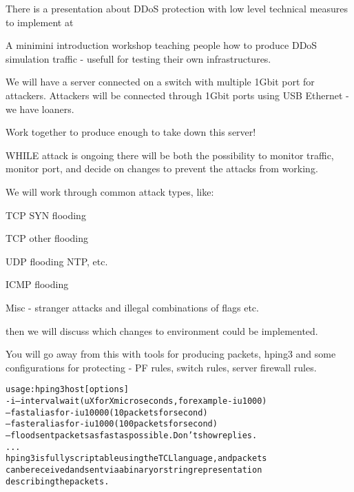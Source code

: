 \documentclass[Screen16to9,17pt]{foils}
\begin{document}
There is a presentation about DDoS protection with low level technical measures to implement at\\
{\footnotesize {}}



A minimini introduction workshop teaching people how to produce DDoS simulation traffic - usefull for testing their own infrastructures.

We will have a server connected on a switch with multiple 1Gbit port for attackers. Attackers will be connected through 1Gbit ports using USB Ethernet - we have loaners.

Work together to produce enough to take down this server!

WHILE attack is ongoing there will be both the possibility to monitor traffic, monitor port, and decide on changes to prevent the attacks from working.


We will work through common attack types, like:

\begin{list2}
\item TCP SYN flooding
\item TCP other flooding
\item UDP flooding NTP, etc.
\item ICMP flooding
\item Misc - stranger attacks and illegal combinations of flags etc.
\end{list2}

then we will discuss which changes to environment could be implemented.

You will go away from this with tools for producing packets, hping3 and some configurations for protecting - PF rules, switch rules, server firewall rules.





\begin{alltt}\footnotesize
usage: hping3 host [options]
  -i  --interval  wait (uX for X microseconds, for example -i u1000)
      --fast      alias for -i u10000 (10 packets for second)
      --faster    alias for -i u1000 (100 packets for second)
      --flood      sent packets as fast as possible. Don't show replies.
...
hping3 is fully scriptable using the TCL language, and packets
can be received and sent via a binary or string representation
describing the packets.
\end{alltt}
\end{document}
